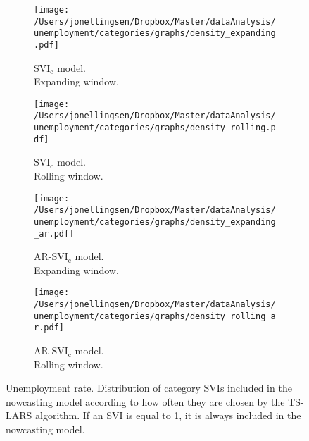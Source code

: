 \begin{figure}[H]
    \centering
    \begin{subfigure}[b]{0.45\textwidth}
\caption{$\text{SVI}_\text{c}$ model.\\Expanding window.}
\label{density_urate_expanding_categories}
        \texttt{[image: /Users/jonellingsen/Dropbox/Master/dataAnalysis/unemployment/categories/graphs/density\_expanding.pdf]}
    \end{subfigure}
    \begin{subfigure}[b]{0.45\textwidth}
\caption{$\text{SVI}_\text{c}$ model.\\Rolling window.}
\label{density_urate_rolling_categories}
        \texttt{[image: /Users/jonellingsen/Dropbox/Master/dataAnalysis/unemployment/categories/graphs/density\_rolling.pdf]}
    \end{subfigure}
\begin{subfigure}[b]{0.45\textwidth}
\caption{AR-$\text{SVI}_\text{c}$ model.\\Expanding window.}
\label{density_urate_ar_expanding_categories}       
\texttt{[image: /Users/jonellingsen/Dropbox/Master/dataAnalysis/unemployment/categories/graphs/density\_expanding\_ar.pdf]}
    \end{subfigure}
\begin{subfigure}[b]{0.45\textwidth}
\caption{AR-$\text{SVI}_\text{c}$ model.\\Rolling window.}
\label{density_urate_ar_rolling_categories}       
\texttt{[image: /Users/jonellingsen/Dropbox/Master/dataAnalysis/unemployment/categories/graphs/density\_rolling\_ar.pdf]}
    \end{subfigure}
\caption{Unemployment rate. Distribution of category SVIs included in the nowcasting model according to how often they are chosen by the TS-LARS algorithm. If an SVI is equal to 1, it is always included in the nowcasting model.}
\label{density_urate_categories}
\end{figure} \clearpage

